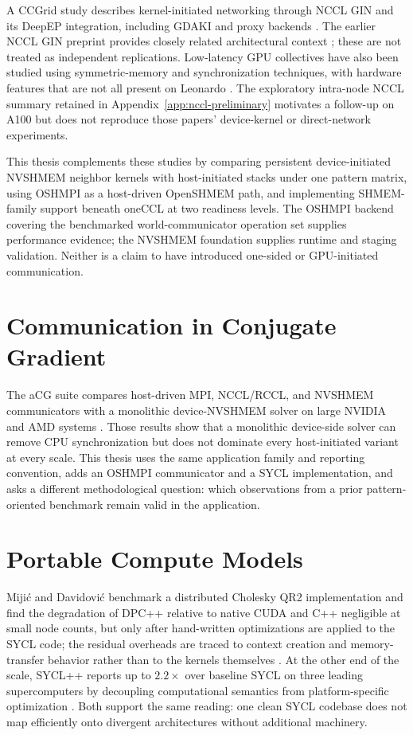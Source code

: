 A CCGrid study describes kernel-initiated networking through NCCL GIN and its DeepEP integration, including GDAKI and proxy backends \cite{hamidouche_kernel-initiated_2026}. The earlier NCCL GIN preprint provides closely related architectural context \cite{hamidouche_gpu-initiated_2025}; these are not treated as independent replications. Low-latency GPU collectives have also been studied using symmetric-memory and synchronization techniques, with hardware features that are not all present on Leonardo \cite{shen_every_2026}. The exploratory intra-node NCCL summary retained in Appendix~\ref{app:nccl-preliminary} motivates a follow-up on A100 but does not reproduce those papers' device-kernel or direct-network experiments.

This thesis complements these studies by comparing persistent device-initiated NVSHMEM neighbor kernels with host-initiated stacks under one pattern matrix, using OSHMPI as a host-driven OpenSHMEM path, and implementing SHMEM-family support beneath oneCCL at two readiness levels. The OSHMPI backend covering the benchmarked world-communicator operation set supplies performance evidence; the NVSHMEM foundation supplies runtime and staging validation. Neither is a claim to have introduced one-sided or GPU-initiated communication.

\section{Communication in Conjugate Gradient}

The aCG suite compares host-driven MPI, NCCL/RCCL, and NVSHMEM communicators with a monolithic device-NVSHMEM solver on large NVIDIA and AMD systems \cite{trotter_cpu-_2025}. Those results show that a monolithic device-side solver can remove CPU synchronization but does not dominate every host-initiated variant at every scale. This thesis uses the same application family and reporting convention, adds an OSHMPI communicator and a SYCL implementation, and asks a different methodological question: which observations from a prior pattern-oriented benchmark remain valid in the application.

\section{Portable Compute Models}\label{sec:related-portability}

Mijić and Davidović benchmark a distributed Cholesky QR2 implementation and find the degradation of DPC++ relative to native CUDA and C++ negligible at small node counts, but only after hand-written optimizations are applied to the SYCL code; the residual overheads are traced to context creation and memory-transfer behavior rather than to the kernels themselves \cite{mijic_benchmark_2023}. At the other end of the scale, SYCL++ reports up to $2.2\times$ over baseline SYCL on three leading supercomputers by decoupling computational semantics from platform-specific optimization \cite{shen_sycl_2026}. Both support the same reading: one clean SYCL codebase does not map efficiently onto divergent architectures without additional machinery.

